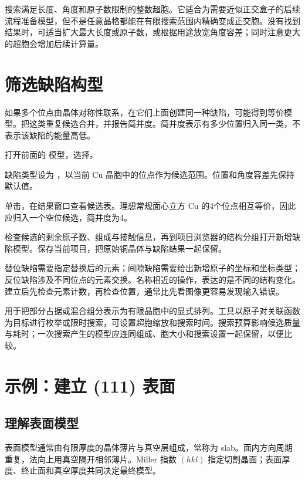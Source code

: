 搜索满足长度、角度和原子数限制的整数超胞。它适合为需要近似正交盒子的后续流程准备模型，但不是任意晶格都能在有限搜索范围内精确变成正交胞。没有找到结果时，可适当扩大最大长度或原子数，或根据用途放宽角度容差；同时注意更大的超胞会增加后续计算量。

\section{筛选缺陷构型}

如果多个位点由晶体对称性联系，在它们上面创建同一种缺陷，可能得到等价模型。把这类重复候选合并，并报告简并度。简并度表示有多少位置归入同一类，不表示该缺陷的能量高低。

\begin{steps}
  \item 打开前面的  模型，选择。
  \item 缺陷类型设为 ，以当前 Cu 晶胞中的位点作为候选范围。位置和角度容差先保持默认值。
  \item 单击，在结果窗口查看候选表。理想常规面心立方 Cu 的4个位点相互等价，因此应归入一个空位候选，简并度为4。
  \item 检查候选的剩余原子数、组成与接触信息，再到项目浏览器的结构分组打开新增缺陷模型。保存当前项目，把原始铜晶体与缺陷结果一起保留。
\end{steps}

替位缺陷需要指定替换后的元素；间隙缺陷需要给出新增原子的坐标和坐标类型；反位缺陷涉及不同位点的元素交换。名称相近的操作，表达的是不同的结构变化。建立后先检查元素计数，再检查位置，通常比先看图像更容易发现输入错误。

用于把部分占据或混合组分表示为有限晶胞中的显式排列。工具以原子对关联函数为目标进行枚举或限时搜索，可设置超胞缩放和搜索时间。搜索预算影响候选质量与耗时；一次搜索产生的模型应连同组成、胞大小和搜索设置一起保留，以便比较。

\section{示例：建立 (111) 表面}

\subsection{理解表面模型}

表面模型通常由有限厚度的晶体薄片与真空层组成，常称为 slab。面内方向周期重复，法向上用真空隔开相邻薄片。Miller 指数 $(hkl)$ 指定切割晶面；表面厚度、终止面和真空厚度共同决定最终模型。

